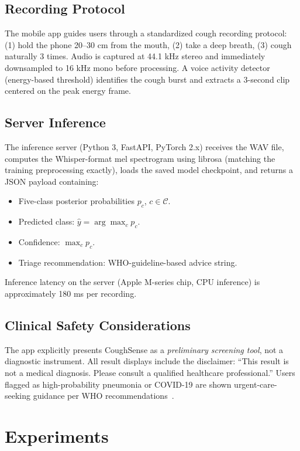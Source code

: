 \documentclass[10pt,journal,compsoc]{IEEEtran}
\begin{document}
\subsection{Recording Protocol}

The mobile app guides users through a standardized cough recording protocol:
(1) hold the phone 20--30 cm from the mouth,
(2) take a deep breath,
(3) cough naturally 3 times.
Audio is captured at 44.1 kHz stereo and immediately downsampled to
16 kHz mono before processing. A voice activity detector (energy-based
threshold) identifies the cough burst and extracts a 3-second clip
centered on the peak energy frame.

\subsection{Server Inference}

The inference server (Python 3, FastAPI, PyTorch 2.x) receives the
WAV file, computes the Whisper-format mel spectrogram using librosa
(matching the training preprocessing exactly), loads the saved model
checkpoint, and returns a JSON payload containing:
\begin{itemize}
    \item Five-class posterior probabilities $p_c$, $c \in \mathcal{C}$.
    \item Predicted class: $\hat{y} = \arg\max_c p_c$.
    \item Confidence: $\max_c p_c$.
    \item Triage recommendation: WHO-guideline-based advice string.
\end{itemize}
Inference latency on the server (Apple M-series chip, CPU inference)
is approximately 180 ms per recording.

\subsection{Clinical Safety Considerations}

The app explicitly presents CoughSense as a \textit{preliminary screening
tool}, not a diagnostic instrument. All result displays include the
disclaimer: ``This result is not a medical diagnosis. Please consult a
qualified healthcare professional.'' Users flagged as high-probability
pneumonia or COVID-19 are shown urgent-care-seeking guidance per WHO
recommendations~\cite{who_cough}.

\section{Experiments}
\label{sec:experiments}
\end{document}
